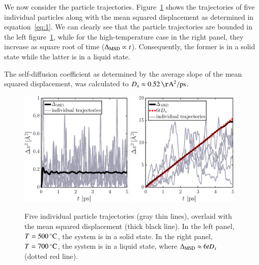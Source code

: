 We now consider the particle trajectories. Figure~\ref{fig:MSD} shows the trajectories of five individual particles along with the mean squared displacement as determined in equation~\eqref{eq:1}. We can clearly see that the particle trajectories are bounded in the left figure~\ref{fig:MSD}, while for the high-temperature case in the right panel, they increase as square root of time ($\Delta_{\rm MSD} \propto t$). Consequently, the former is in a solid state while the latter is in a liquid state. 

The self-diffusion coefficient as determined by the average slope of the mean squared displacement, was calculated to $D_s \approx \unit[0.52]{\AA^2/ps}$.  

\begin{figure}[!ht]
\begin{center}
  \includegraphics[width=0.48\textwidth]{../figures/MSD-500} 
    \includegraphics[width=0.48\textwidth]{../figures/MSD-700} 
  \caption{Five individual particle trajectories (gray thin lines), overlaid with the mean squared displacement (thick black line). In the left panel, $T=\unit[500]{^\circ C}$, the system is in a solid state. In the right panel, $T=\unit[700]{^\circ C}$, the system is in a liquid state, where $\Delta_{\rm MSD} \approx 6 t D_s$ (dotted red line).}
  \label{fig:MSD}
\end{center}
\end{figure}

